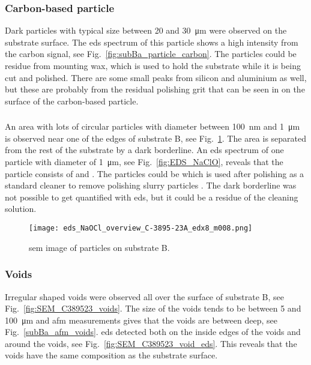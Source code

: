 \subsubsection{Carbon-based particle}
Dark particles with typical size between \SI{20}{} and \SI{30}{\micro\metre} were observed on the substrate surface. The \ac{eds} spectrum of this particle shows a high intensity from the carbon signal, see Fig.~\ref{fig:subBa_particle_carbon}. The particles could be residue from mounting wax, which is used to hold the substrate while it is being cut and polished. There are some small peaks from silicon and aluminium as well, but these are probably from the residual polishing grit that can be seen in on the surface of the carbon-based particle.

\subsubsection{}
An area with lots of circular particles with diameter between \SI{100}{\nano\metre} and \SI{1}{\micro\metre} is observed near one of the edges of substrate B, see Fig.~\ref{fig:eds_NaOCl_overview}. The area is separated from the rest of the substrate by a dark borderline. An \ac{eds} spectrum of one particle with diameter of \SI{1}{\micro\metre}, see Fig.~\ref{fig:EDS_NaClO}, reveals that the particle consists of  and . The particles could be  which is used after polishing as a standard cleaner to remove polishing slurry particles \citep{benson2015as-received}. The dark borderline was not possible to get quantified with \ac{eds}, but it could be a residue of the cleaning solution.

\begin{figure}
    \centering
    \texttt{[image: eds\_NaOCl\_overview\_C-3895-23A\_edx8\_m008.png]}
    \caption[\Ac{sem} image of  particles on substrate B.]{\Ac{sem} image of  particles on substrate B.}
    \label{fig:eds_NaOCl_overview}
\end{figure}


\subsubsection{Voids}
Irregular shaped voids were observed all over the surface of substrate B, see Fig.~\ref{fig:SEM_C389523_voids}. The size of the voids tends to be between \SI{5}{} and \SI{100}{\micro\metre} and \ac{afm} measurements gives that the voids are between  deep, see Fig.~\ref{subBa_afm_voids}. \Ac{eds} detected  both on the inside edges of the voids and around the voids, see Fig.~\ref{fig:SEM_C389523_void_eds}. This reveals that the voids have the same composition as the substrate surface.

